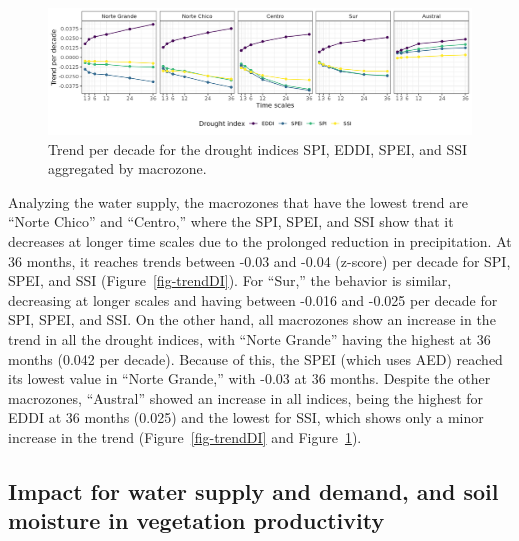 \documentclass[
  authoryear,
  preprint,
  3p,
  onecolumn]{elsarticle}
\begin{document}
\begin{figure}[!ht]

{\centering \includegraphics{../output/figs/trend_macrozone_drought_indices.png}

}

\caption{\label{fig-trendDIMacro}Trend per decade for the drought
indices SPI, EDDI, SPEI, and SSI aggregated by macrozone.}

\end{figure}

Analyzing the water supply, the macrozones that have the lowest trend
are ``Norte Chico'' and ``Centro,'' where the SPI, SPEI, and SSI show
that it decreases at longer time scales due to the prolonged reduction
in precipitation. At 36 months, it reaches trends between -0.03 and
-0.04 (z-score) per decade for SPI, SPEI, and SSI
(Figure~\ref{fig-trendDI}). For ``Sur,'' the behavior is similar,
decreasing at longer scales and having between -0.016 and -0.025 per
decade for SPI, SPEI, and SSI. On the other hand, all macrozones show an
increase in the trend in all the drought indices, with ``Norte Grande''
having the highest at 36 months (0.042 per decade). Because of this, the
SPEI (which uses AED) reached its lowest value in ``Norte Grande,'' with
-0.03 at 36 months. Despite the other macrozones, ``Austral'' showed an
increase in all indices, being the highest for EDDI at 36 months (0.025)
and the lowest for SSI, which shows only a minor increase in the trend
(Figure~\ref{fig-trendDI} and Figure~\ref{fig-trendDIMacro}).

\hypertarget{impact-for-water-supply-and-demand-and-soil-moisture-in-vegetation-productivity}{%
\subsection{Impact for water supply and demand, and soil moisture in
vegetation
productivity}\label{impact-for-water-supply-and-demand-and-soil-moisture-in-vegetation-productivity}}
\end{document}
